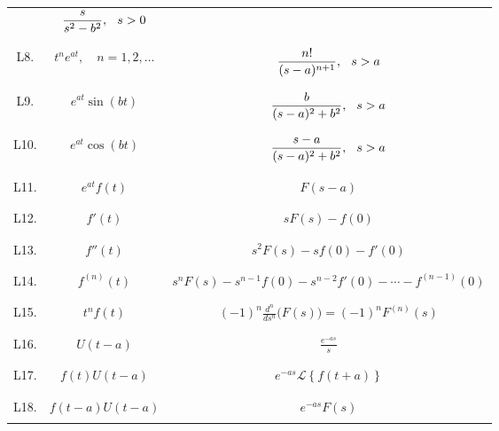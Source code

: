 \documentclass[12pt]{article}
\newcommand{\ds}{\displaystyle}
\newcommand\laplacesym{\mathscr{L}}
\newcommand\lap[1]{\laplacesym\left\{#1\right\}}
\begin{document}
\begin{center}
{\begin{tabular}{|c|c|c|}
                & $\ds \frac{s}{s^2 - b^2},  \hspace{0.25cm}s>0$\\
		&&\\
        \hline
		&&\\
        L8.	    & $t^n e^{at},\quad n = 1, 2, \ldots$	
                & $\ds \frac{n!}{(s-a)^{n+1}},  \hspace{0.25cm}s>a$\\
		&&\\
        \hline
		&&\\
        L9.	    & $e^{at} \sin(bt)$                        
                & $\ds \frac{b}{(s-a)^2 + b^2},  \hspace{0.25cm}s>a$\\
		&&\\
        \hline
		&&\\
        L10.	& $e^{at} \cos(bt)$                	
                & $\ds \frac{s-a}{(s-a)^2 + b^2},  \hspace{0.25cm}s>a$\\
		&&\\
        \hline
		&&\\
        L11.	& $e^{at}f(t)$                        
                & $F(s-a)$\\
		&&\\
        \hline
		&&\\
        L12.	& $f'(t)$                        	
                & $sF(s) - f(0)$\\
		&&\\
        \hline
		&&\\
        L13.	& $f''(t)$                        	
                & $s^2 F(s) - sf(0) - f'(0)$\\
		&&\\
        \hline
		&&\\
        L14.	& $f^{(n)}(t)$                        
                & $s^n F(s) - s^{n-1}f(0) - s^{n-2}f'(0) - \cdots - f^{(n-1)}(0)$\\
		&&\\
        \hline
		&&\\
        L15.	& $t^n f(t)$                        
                & $\ds (-1)^n\frac{d^n}{ds^n}\big( F(s) \big) = (-1)^nF^{(n)}(s)$\\
		&&\\
        \hline
		&&\\
        L16.	& $U(t-a)$                        	
                & $\ds  \frac{e^{-as}}{s}$\\
		&&\\
        \hline
		&&\\
        L17.	& $\ds f(t) U(t-a)$                	
                & $\ds e^{-as} \lap{ f(t+a) }$\\
		&&\\
        \hline
		&&\\
        L18.	& $\ds f(t-a)U(t-a)$                
                & $\ds e^{-as}F(s)$\\
		&&\\
        \hline\hline
	\end{tabular}}
\end{center}
\end{document}
